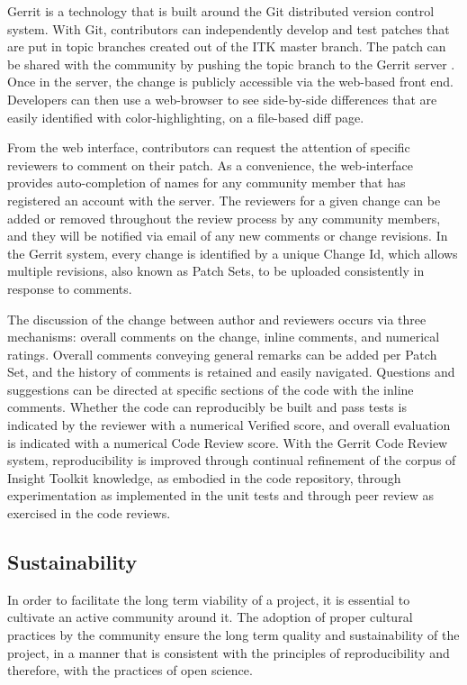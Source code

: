 \documentclass{frontiersENG} %
\begin{document}
Gerrit is a technology that is built around the Git distributed version control
system.  With Git, contributors can independently develop and test patches that
are put in topic branches created out of the ITK master branch.  The
patch can be shared with the community by pushing the topic branch to the
Gerrit server \cite{ITKGerrit}.  Once in the server, the change is publicly
accessible via the web-based front end.  Developers can then use a web-browser
to see side-by-side differences that are easily identified with
color-highlighting, on a file-based diff page.

From the web interface, contributors can request the attention of specific
reviewers to comment on their patch. As a convenience, the web-interface
provides auto-completion of names for any community member that has registered
an account with the server.  The reviewers for a given change can be added or
removed throughout the review process by any community members, and they will
be notified via email of any new comments or change revisions.  In the Gerrit
system, every change is identified by a unique Change Id, which allows multiple
revisions, also known as Patch Sets, to be uploaded consistently in response to
comments.

The discussion of the change between author and reviewers occurs via three
mechanisms: overall comments on the change, inline comments, and numerical
ratings. Overall comments conveying general remarks can be added per Patch
Set, and the history of comments is retained and easily navigated. Questions
and suggestions can be directed at specific sections of the code with the
inline comments. Whether the code can reproducibly be built and pass tests is
indicated by the reviewer with a numerical Verified score, and overall
evaluation is indicated with a numerical Code Review score. With the Gerrit
Code Review system, reproducibility is improved through continual refinement of
the corpus of Insight Toolkit knowledge, as embodied in the code repository,
through experimentation as implemented in the unit tests and through peer
review as exercised in the code reviews.



\subsection{Sustainability}

In order to facilitate the long term viability of a project, it is essential to
cultivate an active community around it. The adoption of proper cultural
practices by the community ensure the long term quality and sustainability of
the project, in a manner that is consistent with the principles of
reproducibility and therefore, with the practices of open science.
\end{document}
